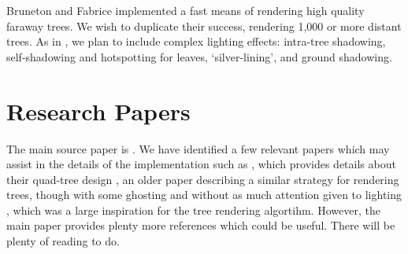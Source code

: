 \documentclass{article}
\begin{document}
Bruneton and Fabrice \cite{trees} implemented a fast means of rendering high quality faraway trees.  We wish to duplicate their success, rendering 1,000 or more distant trees.  As in \cite{trees}, we plan to include complex lighting effects: intra-tree shadowing, self-shadowing and hotspotting for leaves, ‘silver-lining’, and ground shadowing.

\section{Research Papers}
The main source paper is \cite{trees}. We have identified a few relevant papers which may assist in the details of the implementation such as 
\cite{vecterrain}, which provides details about their quad-tree design \cite{treeszbuf}, an older paper describing a similar strategy for rendering trees, though with some ghosting and without as much attention given to lighting \cite{fastlightfield}, which was a large inspiration for the tree rendering algortihm.  However, the main paper provides plenty more references which could be useful. There will be plenty of reading to do.

\end{document}
